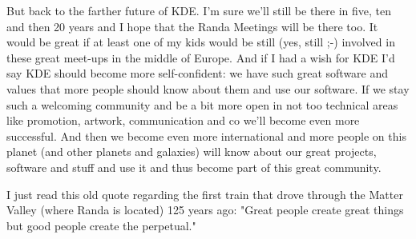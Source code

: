 But back to the farther future of KDE. I'm sure we'll still be there in five, ten and then 20 years and I hope that the Randa Meetings will be there too. It would be great if at least one of my kids would be still (yes, still ;-) involved in these great meet-ups in the middle of Europe. And if I had a wish for KDE I'd say KDE should become more self-confident: we have such great software and values that more people should know about them and use our software. If we stay such a welcoming community and be a bit more open in not too technical areas like promotion, artwork, communication and co we'll become even more successful. And then we become even more international and more people on this planet (and other planets and galaxies) will know about our great projects, software and stuff and use it and thus become part of this great community.

I just read this old quote regarding the first train that drove through the Matter Valley (where Randa is located) 125 years ago: "Great people create great things but good people create the perpetual."